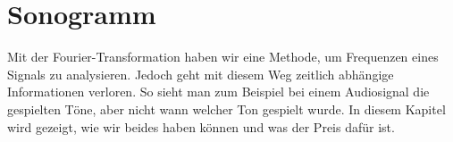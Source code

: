 %
%
%
%
\chapter{Sonogramm\label{chapter:sonogramm}}
\begin{refsection}
%

Mit der Fourier-Transformation haben wir eine Methode, um Frequenzen eines
Signals zu analysieren.
Jedoch geht mit diesem Weg zeitlich abhängige Informationen verloren.
So sieht man zum Beispiel bei einem Audiosignal die gespielten Töne,
aber nicht wann welcher Ton gespielt wurde.
In diesem Kapitel wird gezeigt, wie wir beides haben können und was der
Preis dafür ist.







\printbibliography[heading=subbibliography]
\end{refsection}
